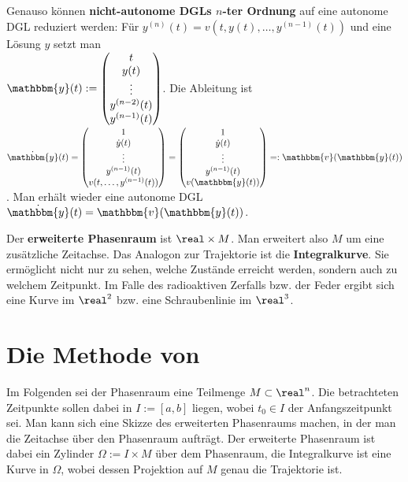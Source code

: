Genauso können \textbf{nicht-autonome DGLs $n$-ter Ordnung}
auf eine autonome DGL reduziert werden:
Für $y^{(n)}(t) = v(t, y(t), \dotsc, y^{(n-1)}(t))$ und eine Lösung $y$ setzt
man \\
$\mathbbm{y}(t) :=
\begin{pmatrix}t \\ y(t) \\ \vdots \\ y^{(n-2)}(t) \\
y^{(n-1)}(t)\end{pmatrix}$.
Die Ableitung ist $\dot{\mathbbm{y}}(t) =
\begin{pmatrix}1 \\ \dot{y}(t) \\ \vdots \\ y^{(n-1)}(t) \\
v(t, \dotsc, y^{(n-1)}(t))\end{pmatrix} =
\begin{pmatrix}1 \\ \dot{y}(t) \\ \vdots \\ y^{(n-1)}(t) \\
v(\mathbbm{y}(t))\end{pmatrix} =: \mathbbm{v}(\mathbbm{y}(t))$.
Man erhält wieder eine autonome DGL
$\dot{\mathbbm{y}}(t) = \mathbbm{v}(\mathbbm{y}(t))$.

\linie

Der \textbf{erweiterte Phasenraum} ist $\real \times M$.
Man erweitert also $M$ um eine zusätzliche Zeitachse.
Das Analogon zur Trajektorie ist die \textbf{Integralkurve}.
Sie ermöglicht nicht nur zu sehen, welche Zustände erreicht werden,
sondern auch zu welchem Zeitpunkt.
Im Falle des radioaktiven Zerfalls bzw. der Feder ergibt sich eine
Kurve im $\real^2$ bzw. eine Schraubenlinie im $\real^3$.

\section{%
    Die Methode von %
}

Im Folgenden sei der Phasenraum eine Teilmenge $M \subset \real^n$.
Die betrachteten Zeitpunkte sollen dabei in $I := [a,b]$ liegen, wobei
$t_0 \in I$ der Anfangszeitpunkt sei.
Man kann sich eine Skizze des erweiterten Phasenraums machen,
in der man die Zeitachse über den Phasenraum aufträgt.
Der erweiterte Phasenraum ist dabei ein Zylinder $\Omega := I \times M$
über dem Phasenraum, die Integralkurve ist eine Kurve in $\Omega$, wobei
dessen Projektion auf $M$ genau die Trajektorie ist.

